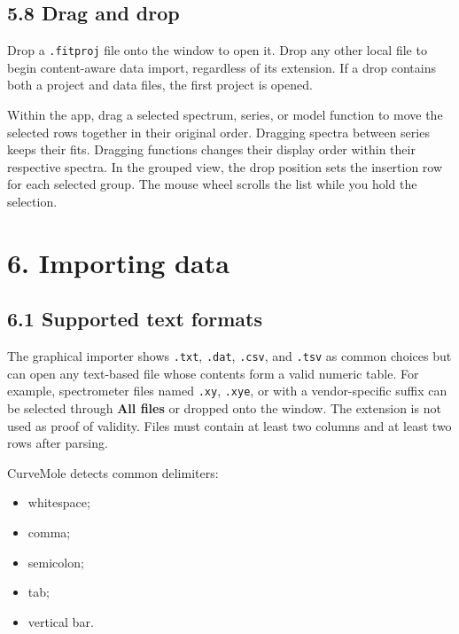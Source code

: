 \documentclass[
  10pt,
  a4paper,
  oneside]{scrreprt}
\providecommand{\tightlist}{%
  \setlength{\itemsep}{0pt}\setlength{\parskip}{0pt}}
\begin{document}
\hypertarget{drag-and-drop}{%
\section{5.8 Drag and drop}\label{drag-and-drop}}

Drop a \texttt{.fitproj} file onto the window to open it. Drop any other
local file to begin content-aware data import, regardless of its
extension. If a drop contains both a project and data files, the first
project is opened.

Within the app, drag a selected spectrum, series, or model function to
move the selected rows together in their original order. Dragging
spectra between series keeps their fits. Dragging functions changes
their display order within their respective spectra. In the grouped
view, the drop position sets the insertion row for each selected group.
The mouse wheel scrolls the list while you hold the selection.

\hypertarget{importing-data}{%
\chapter{6. Importing data}\label{importing-data}}

\hypertarget{supported-text-formats}{%
\section{6.1 Supported text formats}\label{supported-text-formats}}

The graphical importer shows \texttt{.txt}, \texttt{.dat},
\texttt{.csv}, and \texttt{.tsv} as common choices but can open any
text-based file whose contents form a valid numeric table. For example,
spectrometer files named \texttt{.xy}, \texttt{.xye}, or with a
vendor-specific suffix can be selected through \textbf{All files} or
dropped onto the window. The extension is not used as proof of validity.
Files must contain at least two columns and at least two rows after
parsing.

CurveMole detects common delimiters:

\begin{itemize}
\tightlist
\item
  whitespace;
\item
  comma;
\item
  semicolon;
\item
  tab;
\item
  vertical bar.
\end{itemize}
\end{document}
